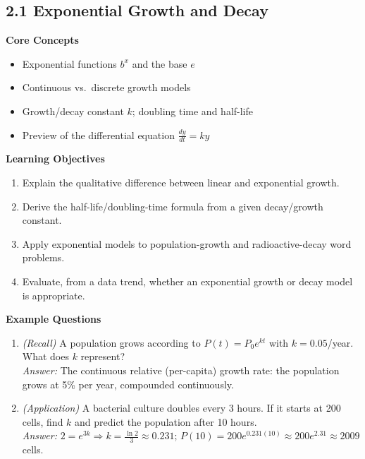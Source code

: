 \documentclass[11pt]{article}
\begin{document}
\subsection{2.1 Exponential Growth and Decay}
\textbf{Core Concepts}
\begin{itemize}
\item Exponential functions $b^x$ and the base $e$
\item Continuous vs.\ discrete growth models
\item Growth/decay constant $k$; doubling time and half-life
\item Preview of the differential equation $\frac{dy}{dt} = ky$
\end{itemize}
\textbf{Learning Objectives}
\begin{enumerate}
\item Explain the qualitative difference between linear and exponential growth.
\item Derive the half-life/doubling-time formula from a given decay/growth constant.
\item Apply exponential models to population-growth and radioactive-decay word problems.
\item Evaluate, from a data trend, whether an exponential growth or decay model is appropriate.
\end{enumerate}
\textbf{Example Questions}
\begin{enumerate}
\item \emph{(Recall)} A population grows according to $P(t) = P_0 e^{kt}$ with $k = 0.05$/year. What does $k$ represent? \\
\textit{Answer:} The continuous relative (per-capita) growth rate: the population grows at 5\% per year, compounded continuously.
\item \emph{(Application)} A bacterial culture doubles every 3 hours. If it starts at 200 cells, find $k$ and predict the population after 10 hours. \\
\textit{Answer:} $2 = e^{3k} \Rightarrow k = \frac{\ln 2}{3} \approx 0.231$; $P(10) = 200e^{0.231(10)} \approx 200e^{2.31}\approx 2009$ cells.
\end{enumerate}
\end{document}
